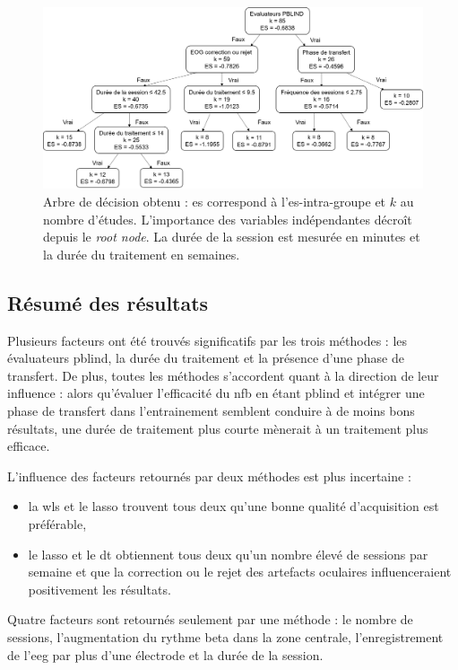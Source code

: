 \begin{figure}[h!]
  \centering
	\includegraphics[width=1\linewidth]{figures/chapter-3/factors-decision-tree} 
  \caption[Arbre de décision]{Arbre de décision obtenu : \gls{es} correspond à l'\gls{es}-intra-groupe et $k$ au nombre d'études. L'importance des variables indépendantes
	décroît depuis le \textit{root node}. La durée de la session est mesurée en minutes et la durée du traitement en semaines.}
  \label{Figure:factors_decision_tree}
\end{figure}

\subsection{Résumé des résultats}

Plusieurs facteurs ont été trouvés significatifs par les trois méthodes : les évaluateurs \gls{pblind}, la durée du traitement et la présence d'une phase de transfert. 
De plus, toutes les méthodes s'accordent quant à la direction de leur influence : alors qu'évaluer l'efficacité du \gls{nfb} en étant \gls{pblind}
et intégrer une phase de transfert dans l'entrainement semblent conduire à de moins bons résultats, une durée de traitement plus courte mènerait à un traitement plus efficace. 

L'influence des facteurs retournés par deux méthodes est plus incertaine :
\begin{itemize}
	\item la \gls{wls} et le \gls{lasso} trouvent tous deux qu'une bonne qualité d'acquisition est préférable,
  \item le \gls{lasso} et le \gls{dt} obtiennent tous deux qu'un nombre élevé de sessions par semaine et que la correction ou le rejet des artefacts oculaires
	influenceraient positivement les résultats. 
\end{itemize}

Quatre facteurs sont retournés seulement par une méthode : le nombre de sessions, l'augmentation du rythme beta dans la zone centrale, l'enregistrement
de l'\gls{eeg} par plus d'une électrode et la durée de la session. 

